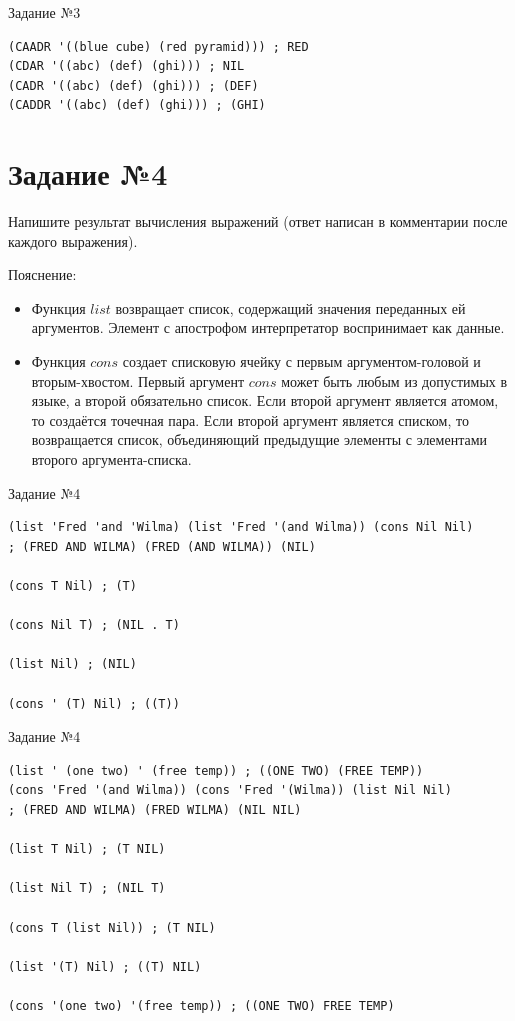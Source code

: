\begin{code}
\caption{Задание №3}
\label{code:bf3}
\begin{verbatim}
(CAADR '((blue cube) (red pyramid))) ; RED
(CDAR '((abc) (def) (ghi))) ; NIL
(CADR '((abc) (def) (ghi))) ; (DEF)
(CADDR '((abc) (def) (ghi))) ; (GHI)
\end{verbatim}
\end{code}

\section{Задание №4}
Напишите результат вычисления выражений (ответ написан в комментарии после каждого выражения).

Пояснение:
\begin{itemize}
	\item Функция $list$ возвращает список, содержащий значения переданных ей аргументов. Элемент с апострофом интерпретатор воспринимает как данные. 
	\item Функция $cons$ создает списковую ячейку с первым аргументом-головой и вторым-хвостом. Первый аргумент $cons$ может быть любым из допустимых в языке, а второй обязательно список. Если второй аргумент является атомом, то создаётся точечная пара. Если второй аргумент является списком, то возвращается список, объединяющий предыдущие элементы с элементами второго аргумента-списка.
\end{itemize}

\begin{code}
\caption{Задание №4}
\label{code:bf4}
\begin{verbatim}
(list 'Fred 'and 'Wilma) (list 'Fred '(and Wilma)) (cons Nil Nil) 
; (FRED AND WILMA) (FRED (AND WILMA)) (NIL)

(cons T Nil) ; (T)

(cons Nil T) ; (NIL . T)

(list Nil) ; (NIL)

(cons ' (T) Nil) ; ((T))
\end{verbatim}
\end{code}

\newpage

\begin{code}
\caption{Задание №4}
\label{code:bf44}
\begin{verbatim}
(list ' (one two) ' (free temp)) ; ((ONE TWO) (FREE TEMP))
(cons 'Fred '(and Wilma)) (cons 'Fred '(Wilma)) (list Nil Nil) 
; (FRED AND WILMA) (FRED WILMA) (NIL NIL)

(list T Nil) ; (T NIL)

(list Nil T) ; (NIL T)

(cons T (list Nil)) ; (T NIL) 

(list '(T) Nil) ; ((T) NIL)

(cons '(one two) '(free temp)) ; ((ONE TWO) FREE TEMP)
\end{verbatim}
\end{code}

